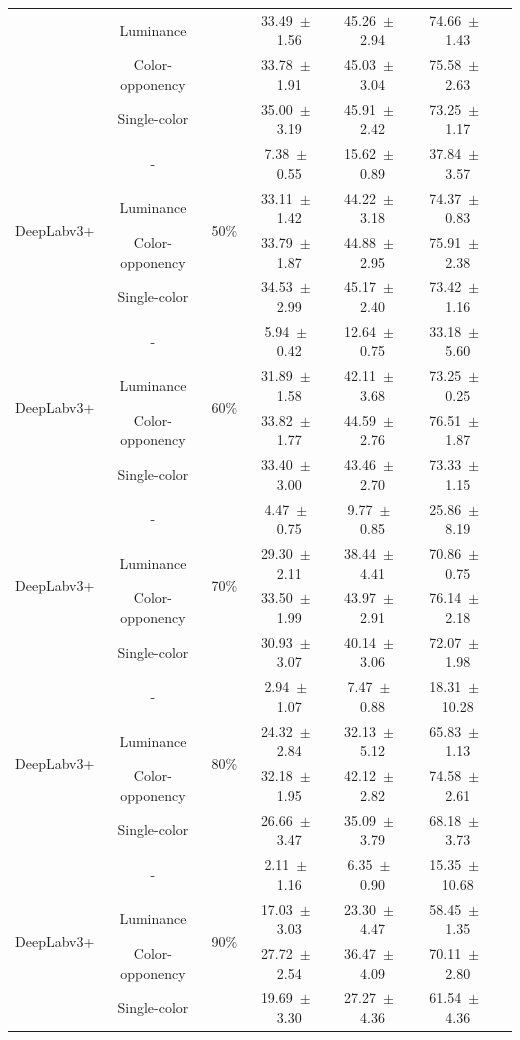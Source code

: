 \begin{table}[h]
\begin{tabular}{@{}lccc ccc@{}}
& Luminance & & 33.49~$\pm$~1.56 & 45.26~$\pm$~2.94 & 74.66~$\pm$~1.43 \\
& Color-opponency & & 33.78~$\pm$~1.91 & 45.03~$\pm$~3.04 & 75.58~$\pm$~2.63 \\
& Single-color & & 35.00~$\pm$~3.19 & 45.91~$\pm$~2.42 & 73.25~$\pm$~1.17 \\
\midrule
\multirow{4}{*}{DeepLabv3+} & - & \multirow{4}{*}{50\%} & 7.38~$\pm$~0.55 & 15.62~$\pm$~0.89 & 37.84~$\pm$~3.57 \\
& Luminance & & 33.11~$\pm$~1.42 & 44.22~$\pm$~3.18 & 74.37~$\pm$~0.83 \\
& Color-opponency & & 33.79~$\pm$~1.87 & 44.88~$\pm$~2.95 & 75.91~$\pm$~2.38 \\
& Single-color & & 34.53~$\pm$~2.99 & 45.17~$\pm$~2.40 & 73.42~$\pm$~1.16 \\
\midrule
\multirow{4}{*}{DeepLabv3+} & - & \multirow{4}{*}{60\%} & 5.94~$\pm$~0.42 & 12.64~$\pm$~0.75 & 33.18~$\pm$~5.60 \\
& Luminance & & 31.89~$\pm$~1.58 & 42.11~$\pm$~3.68 & 73.25~$\pm$~0.25 \\
& Color-opponency & & 33.82~$\pm$~1.77 & 44.59~$\pm$~2.76 & 76.51~$\pm$~1.87 \\
& Single-color & & 33.40~$\pm$~3.00 & 43.46~$\pm$~2.70 & 73.33~$\pm$~1.15 \\
\midrule
\multirow{4}{*}{DeepLabv3+} & - & \multirow{4}{*}{70\%} & 4.47~$\pm$~0.75 & 9.77~$\pm$~0.85 & 25.86~$\pm$~8.19 \\
& Luminance & & 29.30~$\pm$~2.11 & 38.44~$\pm$~4.41 & 70.86~$\pm$~0.75 \\
& Color-opponency & & 33.50~$\pm$~1.99 & 43.97~$\pm$~2.91 & 76.14~$\pm$~2.18 \\
& Single-color & & 30.93~$\pm$~3.07 & 40.14~$\pm$~3.06 & 72.07~$\pm$~1.98 \\
\midrule
\multirow{4}{*}{DeepLabv3+} & - & \multirow{4}{*}{80\%} & 2.94~$\pm$~1.07 & 7.47~$\pm$~0.88 & 18.31~$\pm$~10.28 \\
& Luminance & & 24.32~$\pm$~2.84 & 32.13~$\pm$~5.12 & 65.83~$\pm$~1.13 \\
& Color-opponency & & 32.18~$\pm$~1.95 & 42.12~$\pm$~2.82 & 74.58~$\pm$~2.61 \\
& Single-color & & 26.66~$\pm$~3.47 & 35.09~$\pm$~3.79 & 68.18~$\pm$~3.73 \\
\midrule
\multirow{4}{*}{DeepLabv3+} & - & \multirow{4}{*}{90\%} & 2.11~$\pm$~1.16 & 6.35~$\pm$~0.90 & 15.35~$\pm$~10.68 \\
& Luminance & & 17.03~$\pm$~3.03 & 23.30~$\pm$~4.47 & 58.45~$\pm$~1.35 \\
& Color-opponency & & 27.72~$\pm$~2.54 & 36.47~$\pm$~4.09 & 70.11~$\pm$~2.80 \\
& Single-color & & 19.69~$\pm$~3.30 & 27.27~$\pm$~4.36 & 61.54~$\pm$~4.36 \\
\midrule
\bottomrule
\end{tabular}
\label{tab:sparse_results_deeplabv3plus_acdc_full}
\end{table}